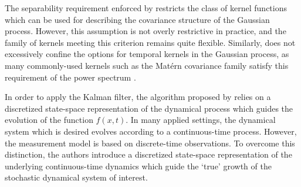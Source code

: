 \documentclass[10pt]{article}
\numberwithin{equation}{section}
\begin{document}
The separability requirement enforced by  restricts the class of kernel functions which can be used for describing the covariance structure of the Gaussian process. However, this assumption is not overly restrictive in practice, and the family of kernels meeting this criterion remains quite flexible. Similarly,  does not excessively confine the options for temporal kernels in the Gaussian process, as many commonly-used kernels such as the Mat{\'e}rn covariance family satisfy this requirement of the power spectrum \citep{GPML-Book-2006}.

In order to apply the Kalman filter, the algorithm proposed by \citeauthor{Todescato-Efficient-2020} relies on a discretized state-space representation of the dynamical process which guides the evolution of the function $f(x, t)$. In many applied settings, the dynamical system which is desired evolves according to a continuous-time process. However, the measurement model is based on discrete-time observations. To overcome this distinction, the authors introduce a discretized state-space representation of the underlying continuous-time dynamics which guide the `true' growth of the stochastic dynamical system of interest.
\end{document}
